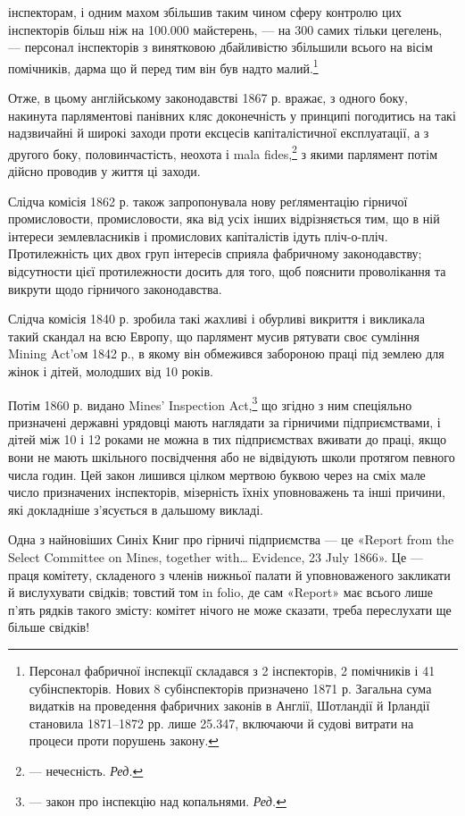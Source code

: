 \parcont{}  %
інспекторам, і одним махом збільшив таким чином сферу контролю
цих інспекторів більш ніж на 100.000 майстерень, — на 300 самих
тільки цегелень, — персонал інспекторів з винятковою дбайливістю
збільшили всього на вісім помічників, дарма що й перед
тим він був надто малий.\footnote{
Персонал фабричної інспекції складався з 2 інспекторів, 2 помічників
і 41 субінспекторів. Нових 8 субінспекторів призначено 1871 р.
Загальна сума видатків на проведення фабричних законів в Англії,
Шотландії й Ірландії становила 1871--1872 рр. лише 25.347,
включаючи й судові витрати на процеси проти порушень закону.
}

Отже, в цьому англійському законодавстві 1867 р. вражає,
з одного боку, накинута парляментові панівних кляс доконечність
у принципі погодитись на такі надзвичайні й широкі заходи
проти ексцесів капіталістичної експлуатації, а з другого боку,
половинчастість, неохота і mala fides,\footnote*{
— нечесність. \emph{Ред.}
} з якими парлямент
потім дійсно проводив у життя ці заходи.

Слідча комісія 1862 р. також запропонувала нову реґляментацію
гірничої промисловости, промисловости, яка від усіх інших
відрізняється тим, що в ній інтереси землевласників і промислових
капіталістів ідуть пліч-о-пліч. Протилежність цих двох
груп інтересів сприяла фабричному законодавству; відсутности
цієї протилежности досить для того, щоб пояснити проволікання
та викрути щодо гірничого законодавства.

Слідча комісія 1840 р. зробила такі жахливі і обурливі викриття
і викликала такий скандал на всю Европу, що парлямент
мусив рятувати своє сумління Mining Act’oм 1842 р., в якому
він обмежився забороною праці під землею для жінок і дітей,
молодших від 10 років.

Потім 1860 р. видано Mines’ Inspection Act,\footnote*{
— закон про інспекцію над копальнями. \emph{Ред.}
} що згідно з ним
спеціяльно призначені державні урядовці мають наглядати за гірничими
підприємствами, і дітей між 10 і 12 роками не можна в
тих підприємствах вживати до праці, якщо вони не мають шкільного
посвідчення або не відвідують школи протягом певного
числа годин. Цей закон лишився цілком мертвою буквою через
на сміх мале число призначених інспекторів, мізерність їхніх
уповноважень та інші причини, які докладніше з’ясується в
дальшому викладі.

Одна з найновіших Синіх Книг про гірничі підприємства —
це «Report from the Select Committee on Mines, together with\dots{}
Evidence, 23 July 1866». Це — праця комітету, складеного з
членів нижньої палати й уповноваженого закликати й вислухувати
свідків; товстий том in folio, де сам «Report» має всього
лише п’ять рядків такого змісту: комітет нічого не може сказати,
треба переслухати ще більше свідків!

